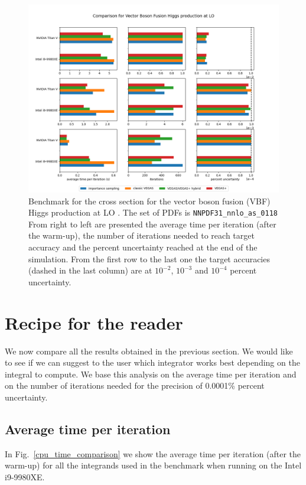 \documentclass[../main/main.tex]{subfiles}
\begin{document}
\begin{figure}[h]
	\centering
	\includegraphics[width=\textwidth]{../images/higgs_correct.png}
	\caption{Benchmark  for the cross section for the vector boson fusion (VBF) Higgs production at LO \cite{Brucherseifer_2014}. The set of PDFs is \texttt{NNPDF31\_nnlo\_as\_0118} From right to left are presented the average time per iteration (after the warm-up), the number of iterations needed to reach target accuracy and the percent uncertainty reached at the end of the simulation. From the first row to the last one the target accuracies (dashed in the last column) are at $10^{-2}$, $10^{-3}$ and $10^{-4}$ percent uncertainty.}
	\label{higgs_plot}
\end{figure}

\section{Recipe for the reader}
We now compare all the results obtained in the previous section. We would like to see if we can suggest to the user which integrator works best depending on the integral to compute. We base this analysis on the average time per iteration and on the number of iterations needed for the precision of 0.0001\% percent uncertainty.

\subsection{Average time per iteration}
In Fig.~\ref{cpu_time_comparison} we show the average time per iteration (after the warm-up) for all the integrands used in the benchmark when running on the Intel i9-9980XE.
\end{document}
